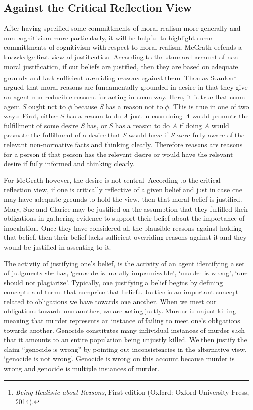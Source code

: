 \documentclass[phdthesis,12pt,final,a4paper]{wuthesis}
\theoremstyle{definition}
\theoremstyle{definition}
\theoremstyle{definition}
\theoremstyle{definition}
\theoremstyle{remark}
\begin{document}
\subsection*{Against the Critical Reflection View}\label{against-the-critical-reflection-view}

After having specified some committments of moral realism more generally and non-cognitivism more particularly, it will be helpful to highlight some committments of cognitivism with respect to moral realism. McGrath defends a knowledge first view of justification. According to the standard account of non-moral justification, if our beliefs are justified, then they are based on adequate grounds and lack sufficient overriding reasons against them. Thomas Scanlon\footnote{\emph{Being Realistic about Reasons}, First edition (Oxford: Oxford University Press, 2014).} argued that moral reasons are fundamentally grounded in desire in that they give an agent non-reducible reasons for acting in some way. Here, it is true that some agent \emph{S} ought not to \(\phi\) because \emph{S} has a reason not to \(\phi\). This is true in one of two ways: First, either \emph{S} has a reason to do \emph{A} just in case doing \emph{A} would promote the fulfillment of some desire \emph{S} has, or \emph{S} has a reason to do \emph{A} if doing \emph{A} would promote the fulfillment of a desire that \emph{S} would have if \emph{S} were fully aware of the relevant non-normative facts and thinking clearly. Therefore reasons are reasons for a person if that person has the relevant desire or would have the relevant desire if fully informed and thinking clearly.

For McGrath however, the desire is not central. According to the critical reflection view, if one is critically reflective of a given belief and just in case one may have adequate grounds to hold the view, then that moral belief is justified. Mary, Sue and Clarice may be justified on the assumption that they fulfilled their obligations in gathering evidence to support their belief about the importance of inoculation. Once they have considered all the plausible reasons against holding that belief, then their belief lacks sufficient overriding reasons against it and they would be justified in assenting to it.

The activity of justifying one's belief, is the activity of an agent identifying a set of judgments she has, `genocide is morally impermissible', `murder is wrong', `one should not plagiarize'. Typically, one justifying a belief begins by defining concepts and terms that comprise that beliefs. Justice is an important concept related to obligations we have towards one another. When we meet our obligations towards one another, we are acting justly. Murder is unjust killing meaning that murder represents an instance of failing to meet one's obligations towards another. Genocide constitutes many individual instances of murder such that it amounts to an entire population being unjustly killed. We then justify the claim ``genocide is wrong'' by pointing out inconsistencies in the alternative view, `genocide is not wrong'. Genocide is wrong on this account because murder is wrong and genocide is multiple instances of murder.
\end{document}
